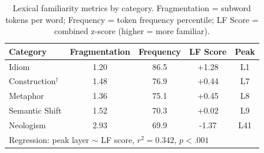 \begin{table}[t]
\centering
\small
\begin{tabular}{lcccc}
\toprule
Category & Fragmentation & Frequency & LF Score & Peak \\
\midrule
Idiom & 1.20 & 86.5 & +1.28 & L1 \\
Construction$^\dagger$ & 1.48 & 76.9 & +0.44 & L7 \\
Metaphor & 1.36 & 75.1 & +0.45 & L8 \\
Semantic Shift & 1.52 & 70.3 & +0.02 & L9 \\
Neologism & 2.93 & 69.9 & -1.37 & L41 \\
\midrule
\multicolumn{5}{l}{Regression: peak layer $\sim$ LF score, $r^2 = 0.342$, $p < .001$} \\
\bottomrule
\end{tabular}
\caption{Lexical familiarity metrics by category. Fragmentation = subword tokens per word; Frequency = token frequency percentile; LF Score = combined z-score (higher = more familiar).}
\label{tab:lf-scores}
\end{table}